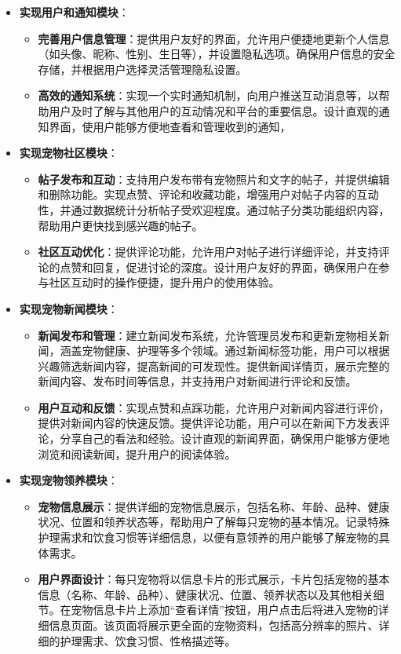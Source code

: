 \begin{itemize}
    \item \textbf{实现用户和通知模块}：
    \begin{itemize}
        \item \textbf{完善用户信息管理}：提供用户友好的界面，允许用户便捷地更新个人信息（如头像、昵称、性别、生日等），并设置隐私选项。确保用户信息的安全存储，并根据用户选择灵活管理隐私设置。 
        \item \textbf{高效的通知系统}：实现一个实时通知机制，向用户推送互动消息等，以帮助用户及时了解与其他用户的互动情况和平台的重要信息。设计直观的通知界面，使用户能够方便地查看和管理收到的通知，
    \end{itemize}

    \item \textbf{实现宠物社区模块}：
    \begin{itemize}
        \item \textbf{帖子发布和互动}：支持用户发布带有宠物照片和文字的帖子，并提供编辑和删除功能。实现点赞、评论和收藏功能，增强用户对帖子内容的互动性，并通过数据统计分析帖子受欢迎程度。通过帖子分类功能组织内容，帮助用户更快找到感兴趣的帖子。        
        \item \textbf{社区互动优化}：提供评论功能，允许用户对帖子进行详细评论，并支持评论的点赞和回复，促进讨论的深度。设计用户友好的界面，确保用户在参与社区互动时的操作便捷，提升用户的使用体验。
    \end{itemize}

    \item \textbf{实现宠物新闻模块}：
    \begin{itemize}
        \item \textbf{新闻发布和管理}：建立新闻发布系统，允许管理员发布和更新宠物相关新闻，涵盖宠物健康、护理等多个领域。通过新闻标签功能，用户可以根据兴趣筛选新闻内容，提高新闻的可发现性。提供新闻详情页，展示完整的新闻内容、发布时间等信息，并支持用户对新闻进行评论和反馈。
        \item \textbf{用户互动和反馈}：实现点赞和点踩功能，允许用户对新闻内容进行评价，提供对新闻内容的快速反馈。提供评论功能，用户可以在新闻下方发表评论，分享自己的看法和经验。设计直观的新闻界面，确保用户能够方便地浏览和阅读新闻，提升用户的阅读体验。
    \end{itemize}

    \item \textbf{实现宠物领养模块}：
    \begin{itemize}
            \item \textbf{宠物信息展示}：提供详细的宠物信息展示，包括名称、年龄、品种、健康状况、位置和领养状态等，帮助用户了解每只宠物的基本情况。记录特殊护理需求和饮食习惯等详细信息，以便有意领养的用户能够了解宠物的具体需求。
            \item \textbf{用户界面设计}：每只宠物将以信息卡片的形式展示，卡片包括宠物的基本信息（名称、年龄、品种）、健康状况、位置、领养状态以及其他相关细节。在宠物信息卡片上添加“查看详情”按钮，用户点击后将进入宠物的详细信息页面。该页面将展示更全面的宠物资料，包括高分辨率的照片、详细的护理需求、饮食习惯、性格描述等。
    \end{itemize}


\end{itemize}

